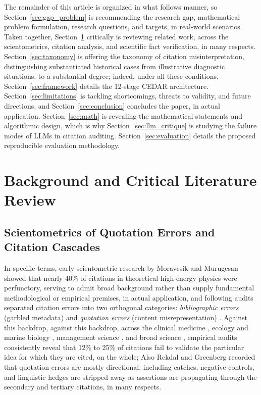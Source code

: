 \documentclass[sigconf]{acmart}
\begin{document}
The remainder of this article is organized in what follows manner, so Section~\ref{sec:gap_problem} is recommending the research gap, mathematical problem formulation, research questions, and targets, in real-world scenarios. Taken together, Section~\ref{sec:related} critically is reviewing related work, across the scientometrics, citation analysis, and scientific fact verification, in many respects. Section~\ref{sec:taxonomy} is offering the taxonomy of citation misinterpretation, distinguishing substantiated historical cases from illustrative diagnostic situations, to a substantial degree; indeed, under all these conditions, Section~\ref{sec:framework} details the 12-stage CEDAR architecture. Section~\ref{sec:limitations} is tackling shortcomings, threats to validity, and future directions, and Section~\ref{sec:conclusion} concludes the paper, in actual application. Section~\ref{sec:math} is revealing the mathematical statements and algorithmic design, which is why Section~\ref{sec:llm_critique} is studying the failure modes of LLMs in citation auditing. Section~\ref{sec:evaluation} details the proposed reproducible evaluation methodology.

\section{Background and Critical Literature Review}
\label{sec:related}

\subsection{Scientometrics of Quotation Errors and Citation Cascades}
In specific terms, early scientometric research by Moravcsik and Murugesan \cite{moravcsik1975some} showed that nearly 40\% of citations in theoretical high-energy physics were perfunctory, serving to admit broad background rather than supply fundamental methodological or empirical premises, in actual application, and following audits separated citation errors into two orthogonal categories: \emph{bibliographic errors} (garbled metadata) and \emph{quotation errors} (content misrepresentation) \cite{delacey1985accurate,jergas2015quotation}. Against this backdrop, against this backdrop, across the clinical medicine \cite{delacey1985accurate,mogull2017accuracy,pavlovic2021accurate}, ecology and marine biology \cite{todd2010marine}, management science \cite{harzing2002referencing}, and broad science \cite{smith2020quotation}, empirical audits consistently reveal that 12\% to 25\% of citations fail to validate the particular idea for which they are cited, on the whole; Also Rekdal \cite{rekdal2014sinking,rekdal2014urban} and Greenberg \cite{greenberg2009citation} recorded that quotation errors are mostly directional, including catches, negative controls, and linguistic hedges \cite{hyland1998hedging} are stripped away as assertions are propagating through the secondary and tertiary citations, in many respects.
\end{document}
